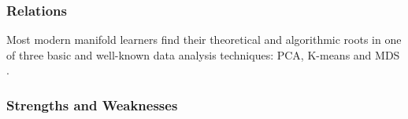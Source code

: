 \subsubsection{Relations}

Most modern manifold learners find their theoretical and algorithmic roots in one of three basic and well-known data analysis techniques: PCA, K-means and MDS \citep{Kegl2008PrincipalManifoldsTextbook}.

\subsubsection{Strengths and Weaknesses}

